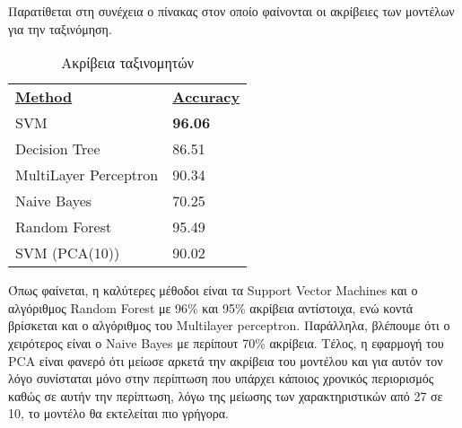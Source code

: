 Παρατίθεται στη συνέχεια ο πίνακας στον οποίο φαίνονται οι ακρίβειες των μοντέλων για την ταξινόμηση.

\begin{table}[H]
\begin{tabular}{ll}
{\ul \textbf{Method}} & {\ul \textbf{Αccuracy}}   \\
SVM                         & \textbf{96.06}  \\
Decision Tree               & 86.51 \\
MultiLayer Perceptron       & 90.34 \\
Naive Bayes                 & 70.25 \\       
Random Forest               & 95.49 \\
SVM (PCA(10))               & 90.02 \\
\end{tabular}
\caption{Ακρίβεια ταξινομητών}
\end{table}

Όπως φαίνεται, η καλύτερες μέθοδοι είναι τα Support Vector Machines και ο αλγόριθμος Random Forest με 96\% και 95\% ακρίβεια αντίστοιχα, ενώ  κοντά βρίσκεται και ο αλγόριθμος του Multilayer perceptron. Παράλληλα, βλέπουμε ότι ο χειρότερος είναι ο Naive Bayes με περίπουτ 70\% ακρίβεια. Τέλος, η εφαρμογή του PCA είναι φανερό ότι μείωσε αρκετά την ακρίβεια του μοντέλου και για αυτόν τον λόγο συνίσταται μόνο στην περίπτωση που υπάρχει κάποιος χρονικός περιορισμός καθώς σε αυτήν την περίπτωση, λόγω της μείωσης των χαρακτηριστικών από 27 σε 10, το μοντέλο θα εκτελείται πιο γρήγορα.  


